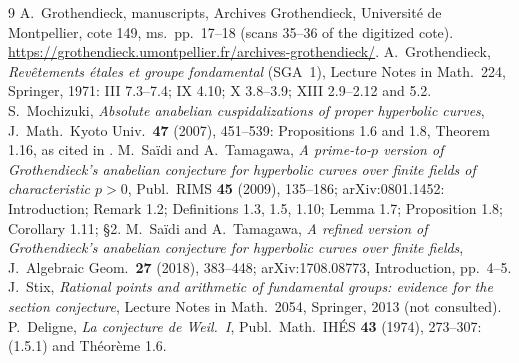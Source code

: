 \begin{thebibliography}{9}
 A.~Grothendieck, manuscripts, Archives Grothendieck, Universit\'e de Montpellier, cote 149, ms.~pp.~17--18 (scans 35--36 of the digitized cote). \url{https://grothendieck.umontpellier.fr/archives-grothendieck/}.
 A.~Grothendieck, \emph{Rev\^etements \'etales et groupe fondamental} (SGA~1), Lecture Notes in Math.\ 224, Springer, 1971: III 7.3--7.4; IX 4.10; X 3.8--3.9; XIII 2.9--2.12 and 5.2.
 S.~Mochizuki, \emph{Absolute anabelian cuspidalizations of proper hyperbolic curves}, J.\ Math.\ Kyoto Univ.\ \textbf{47} (2007), 451--539: Propositions 1.6 and 1.8, Theorem 1.16, as cited in \cite[\S 2]{ST09}.
 M.~Sa\"idi and A.~Tamagawa, \emph{A prime-to-$p$ version of Grothendieck's anabelian conjecture for hyperbolic curves over finite fields of characteristic $p>0$}, Publ.\ RIMS \textbf{45} (2009), 135--186; arXiv:0801.1452: Introduction; Remark 1.2; Definitions 1.3, 1.5, 1.10; Lemma 1.7; Proposition 1.8; Corollary 1.11; \S 2.
 M.~Sa\"idi and A.~Tamagawa, \emph{A refined version of Grothendieck's anabelian conjecture for hyperbolic curves over finite fields}, J.\ Algebraic Geom.\ \textbf{27} (2018), 383--448; arXiv:1708.08773, Introduction, pp.~4--5.
 J.~Stix, \emph{Rational points and arithmetic of fundamental groups: evidence for the section conjecture}, Lecture Notes in Math.\ 2054, Springer, 2013 (not consulted).
 P.~Deligne, \emph{La conjecture de Weil.~I}, Publ.\ Math.\ IH\'ES \textbf{43} (1974), 273--307: (1.5.1) and Th\'eor\`eme 1.6.
\end{thebibliography}


